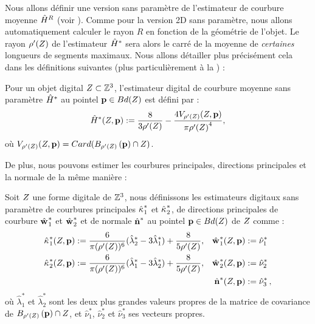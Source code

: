 Nous allons définir une version sans paramètre de l'estimateur de courbure
moyenne $\hat{H}^{R}$ (voir ).
Comme pour la version 2D sans paramètre, nous allons automatiquement calculer le
rayon $R$ en fonction de la géométrie de l'objet. Le rayon $\rho'(Z)$ de
l'estimateur $\hat{H}^{*}$ sera alors le carré de la moyenne de \emph{certaines}
longueurs de segments maximaux. Nous allons détailler plus précisément cela
dans les définitions suivantes (plus particulièrement à la ) :
%
\begin{definition}
  Pour un objet digital $Z \subset \mathbb{Z}^3$, l'estimateur digital de
  courbure moyenne sans paramètre $\hat{H}^{*}$ au pointel $\mathbf{p} \in
  Bd({Z})$ est défini par :
  \begin{equation}
    \hat{H}^{*}( Z, \mathbf{p} ) := \frac{8}{3 {\rho'(Z)}} - \frac{4 V_{{\rho'(Z)}}(Z, \mathbf{p})}{\pi{{\rho'(\ensuremath{Z})}}^4} ,
    \label{def:curvature-estimator-3d-mean-pf}
  \end{equation}
  où $V_{\rho'(Z)}(Z, \mathbf{p}) = Card(B_{\rho'(Z)}\left(\mathbf{p}\right) \cap Z)$.
\end{definition}
%
De plus, nous pouvons estimer les courbures principales, directions principales
et la normale de la même manière :
%
\begin{definition}
  Soit $Z$ une forme digitale de $\mathbb{Z}^3$, nous définissons les estimateurs
  digitaux sans paramètre de courbures principales $\hat{\kappa_{}}_{1}^{*}$ et
  $\hat{\kappa_{}}_{2}^{*}$, de directions principales de courbure $\hat{\mathbf{w}_{}}_{1}^{*}$ et
  $\hat{\mathbf{w}_{}}_{2}^{*}$ et de normale $\hat{\mathbf{n}{}}^{*}$ au pointel $\mathbf{p} \in
  Bd({Z})$ de $Z$ comme :
  \begin{align}
      \hat{\kappa_{}}_{1}^{*}(Z, \mathbf{p})  &:= \frac{6}{\pi (\rho'(Z))^6}(\hat{\lambda}^{*}_2 - 3\hat{\lambda}^{*}_1) + \frac{8}{5 \rho'(Z)},
      &\hat{\mathbf{w}_{}}_{1}^{*}(Z, \mathbf{p}) &:= \hat{\nu}^{*}_1 \\
      \hat{\kappa_{}}_{2}^{*}(Z, \mathbf{p}) &:= \frac{6}{\pi (\rho'(Z))^6}(\hat{\lambda}^{*}_1 - 3\hat{\lambda}^{*}_2) + \frac{8}{5 \rho'(Z)},
      &\hat{\mathbf{w}_{}}_{2}^{*}(Z, \mathbf{p}) &:= \hat{\nu}^{*}_2\\
      & &\hat{\mathbf{n}{}}^{*}(Z, \mathbf{p}) &:=\hat{\nu}^{*}_3\,,
  \end{align}
  où $\hat{\lambda}^{*}_1$ et $\hat{\lambda}^{*}_2$ sont les deux plus grandes
  valeurs propres de la matrice de covariance de $B_{{\rho'(Z)}}\left(\mathbf{p}\right)
  \cap Z$, et $ \hat{\nu}^{*}_1$, $\hat{\nu}^{*}_2$ et $\hat{\nu}^{*}_3$
  ses vecteurs propres.
  \label{def:curvature-estimator-3d-k1k2-pf}
\end{definition}
